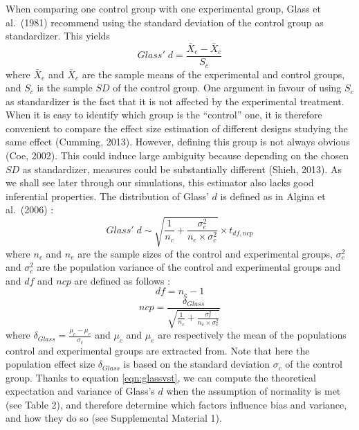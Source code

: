 \documentclass[
  english,
  man,floatsintext]{apa6}
\begin{document}
When comparing one control group with one experimental group, Glass et al.~(1981) recommend using the standard deviation of the control group as standardizer. This yields
\begin{equation*} 
Glass' \; d = \frac{\bar{X}_{e} - \bar{X}_{c}}{S_{c}}
\label{eqn:Glassds}
\end{equation*}
where \(\bar{X}_{e}\) and \(\bar{X}_{c}\) are the sample means of the experimental and control groups, and \(S_{c}\) is the sample \(SD\) of the control group. One argument in favour of using \(S_c\) as standardizer is the fact that it is not affected by the experimental treatment. When it is easy to identify which group is the ``control'' one, it is therefore convenient to compare the effect size estimation of different designs studying the same effect (Cumming, 2013). However, defining this group is not always obvious (Coe, 2002). This could induce large ambiguity because depending on the chosen \(SD\) as standardizer, measures could be substantially different (Shieh, 2013). As we shall see later through our simulations, this estimator also lacks good inferential properties. The distribution of Glass' \(d\) is defined as in Algina et al.~(2006) :
\begin{equation} 
Glass' \; d \sim \sqrt{\frac{1}{n_{c}}+\frac{\sigma_{e}^2}{n_{e} \times \sigma^2_{c}}} \times t_{df,ncp}
\label{eqn:glassvst}
\end{equation}
where \(n_c\) and \(n_e\) are the sample sizes of the control and experimental groups, \(\sigma^2_c\) and \(\sigma^2_e\) are the population variance of the control and experimental groups and and \(df\) and \(ncp\) are defined as follows :
\begin{equation} 
df = n_{c}-1
\label{eqn:glassdf}
\end{equation}
\begin{equation*} 
ncp = \frac{\delta_{Glass}}{\sqrt{\frac{1}{n_{c}} + \frac{\sigma_{e}^2}{n_{e} \times \sigma^2_{c}}}}
\label{eqn:glassncp}
\end{equation*}
where \(\delta_{Glass} = \frac{\mu_{c}-\mu_{e}}{\sigma_{c}}\) and \(\mu_c\) and \(\mu_e\) are respectively the mean of the populations control and experimental groups are extracted from. Note that here the population effect size \(\delta_{Glass}\) is based on the standard deviation \(\sigma_c\) of the control group. Thanks to equation \ref{eqn:glassvst}, we can compute the theoretical expectation and variance of Glass's \(d\) when the assumption of normality is met (see Table 2), and therefore determine which factors influence bias and variance, and how they do so (see Supplemental Material 1).
\end{document}
